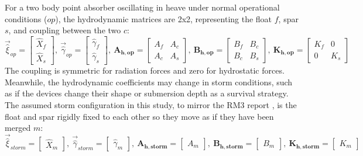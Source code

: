 For a two body point absorber oscillating in heave under normal operational conditions ($op$), the hydrodynamic matrices are 2x2, representing the float $f$, spar $s$, and coupling between the two $c$:
\begin{equation}
    \vec{\hat{\xi}}_{op} = \begin{bmatrix}
        \hat{X}_f \\ \hat{X}_s
    \end{bmatrix},~
    \vec{\hat{\gamma}}_{op} = \begin{bmatrix}
        \hat{\gamma}_f \\ \hat{\gamma}_s
    \end{bmatrix},~
    \mathbf{A_{h,op}} = \begin{bmatrix}
        A_f & A_c \\ A_c & A_s
    \end{bmatrix},~ 
    \mathbf{B_{h,op}} = \begin{bmatrix}
        B_f & B_c \\ B_c & B_s
    \end{bmatrix},~
    \mathbf{K_{h,op}} = \begin{bmatrix}
        K_f & 0\\ 0 & K_s
    \end{bmatrix}
\end{equation}
The coupling is symmetric for radiation forces and zero for hydrostatic forces.
Meanwhile, the hydrodynamic coefficients may change in storm conditions, such as if the devices change their shape or submersion depth as a survival strategy.
The assumed storm configuration in this study, to mirror the RM3 report \cite{RM3}, is the float and spar rigidly fixed to each other so they move as if they have been merged $m$:
\begin{equation}
    \vec{\hat{\xi}}_{storm} = \begin{bmatrix}
        \hat{X}_m 
    \end{bmatrix},~\vec{\hat{\gamma}}_{storm} = \begin{bmatrix}
        \hat{\gamma}_m
    \end{bmatrix},
    ~\mathbf{A_{h,storm}} = \begin{bmatrix}
        A_m 
    \end{bmatrix},~ \mathbf{B_{h,storm}} = \begin{bmatrix}
        B_m
    \end{bmatrix},~
    \mathbf{K_{h,storm}} = \begin{bmatrix}
        K_m
    \end{bmatrix}
\end{equation}
